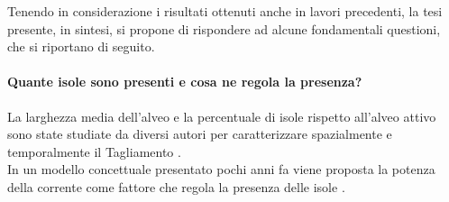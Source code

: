 Tenendo in considerazione i risultati ottenuti anche in lavori precedenti, la tesi presente, in sintesi, si propone di rispondere ad alcune fondamentali questioni, che si riportano di seguito.
%
\paragraph{Quante isole sono presenti e cosa ne regola la presenza?}
La larghezza media dell'alveo e la percentuale di isole rispetto all'alveo attivo sono state studiate da diversi autori per caratterizzare spazialmente e temporalmente il Tagliamento .
%
\\
In un modello concettuale presentato pochi anni fa viene proposta la potenza della corrente come fattore che regola la presenza delle isole .%


